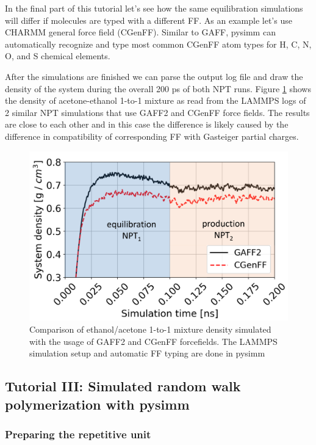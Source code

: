 \documentclass[9pt,tutorial]{livecoms}
\begin{document}
In the final part of this tutorial let's see how the same equilibration simulations will differ if molecules are typed with a different FF. As an example let's use CHARMM general force field (CGenFF). Similar to GAFF, pysimm can automatically recognize and type most common CGenFF atom types for H, C, N, O, and S chemical elements.

After the simulations are finished we can parse the output log file and draw the density of the system during the overall 200 ps of both NPT runs. Figure \ref{ff-diff} shows the density of acetone-ethanol 1-to-1 mixture as read from the LAMMPS logs of 2 similar NPT simulations that use GAFF2 and CGenFF force fields. The results are close to each other and in this case the difference is likely caused by the difference in compatibility of corresponding FF with Gasteiger partial charges. 

\begin{figure}[htbp]
  \centering
    \includegraphics[width=0.9\columnwidth]{figures/figure5}
    \caption{Comparison of ethanol/acetone 1-to-1 mixture density simulated with the usage of GAFF2 and CGenFF forcefields. The LAMMPS simulation setup and automatic FF typing are done in pysimm}
    \label{ff-diff}
\end{figure}

\subsection{Tutorial III: Simulated random walk polymerization with pysimm}

\subsubsection{Preparing the repetitive unit}
\end{document}
